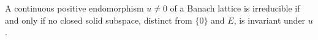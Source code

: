 A continuous positive endomorphism $u \neq 0$ of a Banach lattice is irreducible if and only if no closed solid subspace, distinct from $\{0\}$ and $E$, is invariant under $u$.
